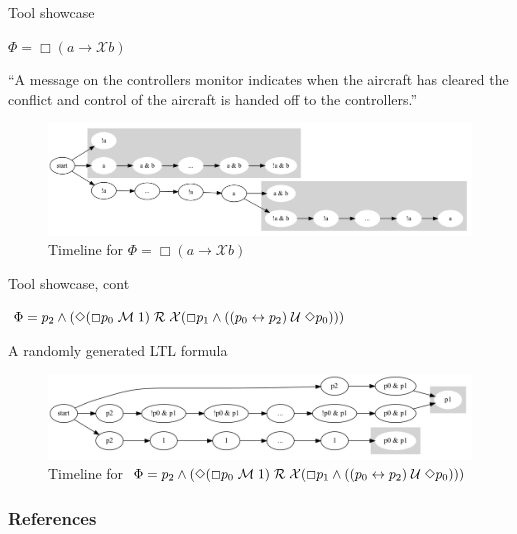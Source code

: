 \documentclass[handout]{beamer}
\newcommand{\alwaysf}{\Box}
\newcommand{\nexttf}{\mathcal{X}}
\newcommand{\evenf}{\Diamond}
\newcommand{\stronguntil}{\hspace{0.1cm} \mathcal{U}  \hspace{0.1cm}}
\newcommand{\strongrelease}{\hspace{0.1cm} \mathcal{M} \hspace{0.1cm}}
\newcommand{\weakrelease}{\hspace{0.1cm} \mathcal{R} \hspace{0.1cm}}
\newcommand{\limplies}{\rightarrow}
\newcommand{\liff}{\leftrightarrow}
\begin{document}
\begin{frame}{Tool showcase}
    \begin{example}
        $\Phi = \alwaysf (a \limplies \nexttf b)$
        
        ``A message on the controllers monitor indicates when the aircraft has cleared the conflict and control of the aircraft is handed off to the controllers.''\cite{ZR14}

        \begin{figure}
            \centering
            \includegraphics[scale=0.25]{examples/ex4/ex4.gv.png}
            \caption{Timeline for $\Phi = \alwaysf (a \limplies \nexttf b)$}
            \label{fig:my_label}
        \end{figure}
    \end{example}
\end{frame}

\begin{frame}{Tool showcase, cont}
    \begin{example}
        $\Phi = p_2 \land (\evenf (\alwaysf p_0 \strongrelease  1) \weakrelease \nexttf(\alwaysf p_1 \land ((p_0 \liff p_2) \stronguntil \evenf p_0)))$

        A randomly generated LTL formula

        \begin{figure}
            \centering
            \includegraphics[scale=0.25]{examples/ex13/ex13.gv.png}
            \caption{Timeline for $\Phi = p_2 \land (\evenf (\alwaysf p_0 \strongrelease  1) \weakrelease \nexttf(\alwaysf p_1 \land ((p_0 \liff p_2) \stronguntil \evenf p_0)))$}
        \end{figure}
    \end{example}
\end{frame}

\begin{frame}
    \frametitle{References}
    \printbibliography
\end{frame}
\end{document}
